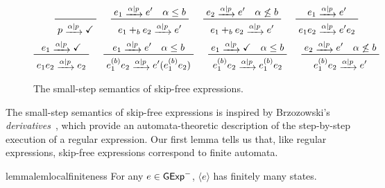 \documentclass[orivec,envcountsect,envcountsame]{llncs}
\begin{document}
    \begin{figure}[!t]
        \begin{gather*}
            \prftree{}{p \tr{\alpha\mid p} \checkmark}
            \hspace{1.5em}
            \prftree{e_1 \tr{\alpha \mid p} e' \quad \alpha \leq b}{e_1 +_b e_2 \tr{\alpha \mid p} e'}
            \hspace{1.5em}
            \prftree{e_2 \tr{\alpha \mid p} e' \quad \alpha \not\leq b}{e_1 +_b e_2 \tr{\alpha \mid p} e'} \hspace{1.5em}
            \prftree{e_1 \tr{\alpha \mid p} e'}{e_1e_2 \tr{\alpha \mid p} e'e_2} \\
            \prftree{e_1 \tr{\alpha \mid p} \checkmark}{e_1e_2 \tr{\alpha \mid p} e_2}
            \hspace{1.5em}
            \prftree{e_1 \tr{\alpha \mid p} e' \quad \alpha \leq b}{e_1^{(b)}e_2 \tr{\alpha \mid p} e'(e_1^{(b)}e_2)}
            \hspace{1.5em}
            \prftree{e_1 \tr{\alpha \mid p} \checkmark \quad \alpha \leq b}{e_1^{(b)}e_2 \tr{\alpha \mid p} e_1^{(b)}e_2}
            \hspace{1.5em}
            \prftree{e_2 \tr{\alpha \mid p} e' \quad \alpha \not\leq b}{e_1^{(b)}e_2 \tr{\alpha \mid p} e'}
        \end{gather*}
        \caption{\label{fig:small-step GKAT}
        The small-step semantics of skip-free  \GKAT expressions.
        }
    \end{figure}
    The small-step semantics of skip-free  \GKAT expressions is inspired by Brzozowski's \emph{derivatives}~\cite{brzozowski}, which provide an automata-theoretic description of the step-by-step execution of a regular expression.
    Our first lemma tells us that, like regular expressions, skip-free  \GKAT expressions correspond to finite automata.

    \begin{restatable}{lemma}{lemlocalfiniteness}\label{lem:local finiteness}
        For any \(e \in \mathsf{GExp}^-\), \(\langle e\rangle\) has finitely many states.
    \end{restatable}
\end{document}
